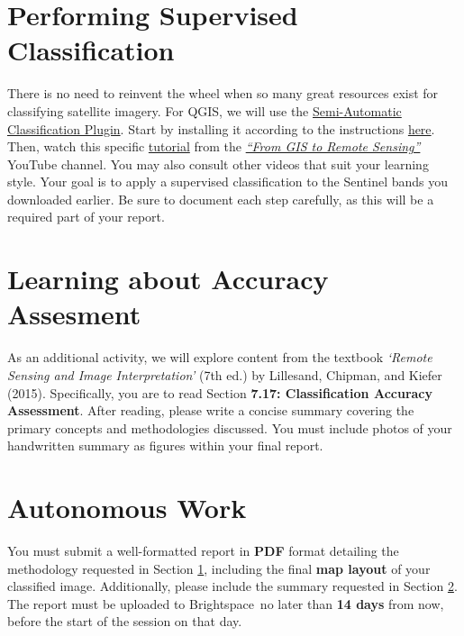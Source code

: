 \documentclass{article}
\begin{document}
\section{Performing Supervised Classification} \label{sec:class}
There is no need to reinvent the wheel when so many great resources exist for classifying satellite imagery. For QGIS, we will use the \href{https://semiautomaticclassificationmanual.readthedocs.io/en/latest/}{Semi-Automatic Classification Plugin}. Start by installing it according to the instructions \href{https://semiautomaticclassificationmanual.readthedocs.io/en/latest/installation.html}{here}. Then, watch this specific \href{https://youtu.be/7SZDCFXjIbA?si=XzImodNE6tb-9VD8}{tutorial} from the \href{https://www.youtube.com/@LucaCongedoGIS}{\textit{``From GIS to Remote Sensing''}} YouTube channel. You may also consult other videos that suit your learning style. Your goal is to apply a supervised classification to the Sentinel bands you downloaded earlier. Be sure to document each step carefully, as this will be a required part of your report.

\section{Learning about Accuracy Assesment} \label{sec:asses}
As an additional activity, we will explore content from the textbook \textit{`Remote Sensing and Image Interpretation'} (7th ed.) by Lillesand, Chipman, and Kiefer (2015). Specifically, you are to read Section \textbf{7.17: Classification Accuracy Assessment}. After reading, please write a concise summary covering the primary concepts and methodologies discussed. You must include photos of your handwritten summary as figures within your final report.

\section{Autonomous Work}
You must submit a well-formatted report in \textbf{PDF} format detailing the methodology requested in Section \ref{sec:class}, including the final \textbf{map layout} of your classified image. Additionally, please include the summary requested in Section \ref{sec:asses}. The report must be uploaded to Brightspace\texttrademark\ no later than \textbf{14 days} from now, before the start of the session on that day.
\end{document}
